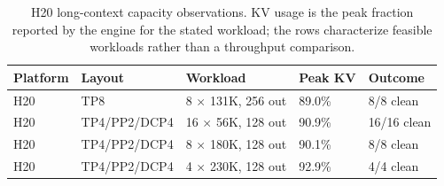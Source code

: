 
\begin{table}[H]
\centering
\caption{H20 long-context capacity observations. KV usage is the peak fraction reported by the engine for the stated workload; the rows characterize feasible workloads rather than a throughput comparison.}
\label{tab:mol_layout_capacity}
\scriptsize
\begin{tabular}{lllll}
\toprule
Platform & Layout & Workload & Peak KV & Outcome \\
\midrule
H20 & TP8 & 8 $\times$ 131K, 256 out & 89.0\% & 8/8 clean \\
H20 & TP4/PP2/DCP4 & 16 $\times$ 56K, 128 out & 90.9\% & 16/16 clean \\
H20 & TP4/PP2/DCP4 & 8 $\times$ 180K, 128 out & 90.1\% & 8/8 clean \\
H20 & TP4/PP2/DCP4 & 4 $\times$ 230K, 128 out & 92.9\% & 4/4 clean \\
\bottomrule
\end{tabular}%
\end{table}

